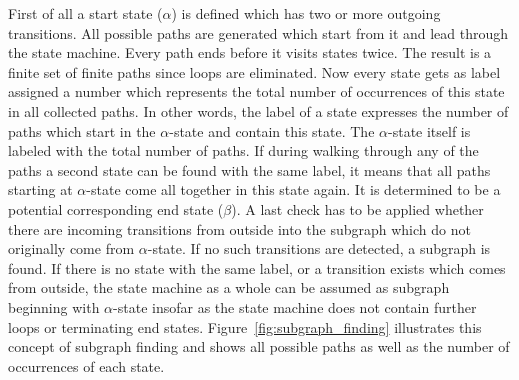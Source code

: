 First of all a start state ($\alpha$) is defined which has two or more outgoing transitions. All possible paths are generated which start from it and lead through the state machine. Every path ends before it visits states twice.
The result is a finite set of finite paths since loops are eliminated. Now every state gets as label assigned a number which represents the total number of occurrences of this state in all collected paths. In other words, the label of a state expresses the number of paths which start in the $\alpha$-state and contain this state. The $\alpha$-state itself is labeled with the total number of paths. If during walking through any of the paths a second state can be found with the same label, it means that all paths starting at $\alpha$-state come all together in this state again. It is determined to be a potential corresponding end state ($\beta$).
A last check has to be applied whether there are incoming transitions from outside into the subgraph which do not originally come from $\alpha$-state. If no such transitions are detected, a subgraph is found.
If there is no state with the same label, or a transition exists which comes from outside, the state machine as a whole can be assumed as subgraph beginning with $\alpha$-state insofar as the state machine does not contain further loops or terminating end states. Figure~\ref{fig:subgraph_finding} illustrates this concept of subgraph finding and shows all possible paths as well as the number of occurrences of each state.
